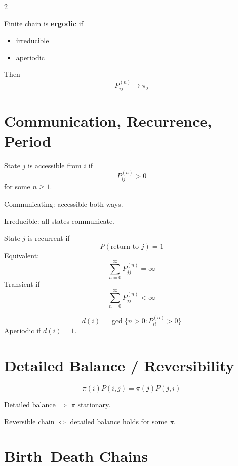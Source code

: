 \documentclass[10pt]{article}
\begin{document}
\begin{multicols}{2}
\begin{theorembox}
Finite chain is \textbf{ergodic} if
\begin{itemize}[leftmargin=12pt,itemsep=1pt]
\item irreducible
\item aperiodic
\end{itemize}
Then
\[
P_{ij}^{(n)}\to \pi_j
\]
\end{theorembox}

\section{Communication, Recurrence, Period}

\begin{definitionbox}
State \(j\) is accessible from \(i\) if
\[
P_{ij}^{(n)}>0
\]
for some \(n\ge 1\).
\end{definitionbox}

Communicating: accessible both ways.

Irreducible: all states communicate.

\begin{definitionbox}
State \(j\) is recurrent if
\[
P(\text{return to }j)=1
\]
Equivalent:
\[
\sum_{n=0}^\infty P_{jj}^{(n)}=\infty
\]
Transient if
\[
\sum_{n=0}^\infty P_{jj}^{(n)}<\infty
\]
\end{definitionbox}

\begin{formulabox}
\[
d(i)=\gcd\{n>0 : P_{ii}^{(n)}>0\}
\]
Aperiodic if \(d(i)=1\).
\end{formulabox}

\section{Detailed Balance / Reversibility}

\begin{formulabox}
\[
\pi(i)P(i,j)=\pi(j)P(j,i)
\]
\end{formulabox}

Detailed balance \(\Rightarrow\) \(\pi\) stationary.

Reversible chain \(\iff\) detailed balance holds for some \(\pi\).

\section{Birth--Death Chains}


\end{multicols}
\end{document}

